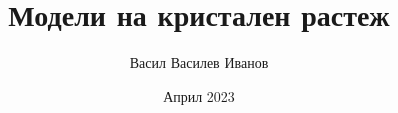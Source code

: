 \documentclass[12pt]{article}
\title{Модели на кристален растеж}
\author{Васил Василев Иванов}
\date{Април 2023}
\begin{document}

\tableofcontents





\nocite{SMDGarxiv}
\nocite{ivanmarkovpreprint}
\nocite{MastersThesisLatexSource}
\printbibliography[heading=bibintoc]
\end{document}
